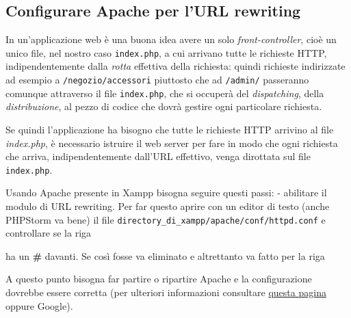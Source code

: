 \hypertarget{configurare-apache-per-lurl-rewriting}{%
\subsection{Configurare Apache per l'URL
rewriting}\label{configurare-apache-per-lurl-rewriting}}

In un'applicazione web è una buona idea avere un solo
\emph{front-controller}, cioè un unico file, nel nostro caso
\texttt{index.php}, a cui arrivano tutte le richieste HTTP,
indipendentemente dalla \emph{rotta} effettiva della richiesta: quindi
richieste indirizzate ad esempio a \texttt{/negozio/accessori} piuttosto
che ad \texttt{/admin/} passeranno comunque attraverso il file
\texttt{index.php}, che si occuperà del \emph{dispatching}, della
\emph{distribuzione}, al pezzo di codice che dovrà gestire ogni
particolare richiesta.

Se quindi l'applicazione ha bisogno che tutte le richieste HTTP arrivino
al file \emph{index.php}, è necessario istruire il web server per fare
in modo che ogni richiesta che arriva, indipendentemente dall'URL
effettivo, venga dirottata sul file \texttt{index.php}.

Usando Apache presente in Xampp bisogna seguire questi passi: -
abilitare il modulo di URL rewriting. Per far questo aprire con un
editor di testo (anche PHPStorm va bene) il file
\texttt{directory\_di\_xampp/apache/conf/httpd.conf} e controllare se la
riga

\begin{Shaded}
\begin{Highlighting}[]
\end{Highlighting}
\end{Shaded}

ha un \textbf{\#} davanti. Se così fosse va eliminato e altrettanto va
fatto per la riga

\begin{Shaded}
\begin{Highlighting}[]
\end{Highlighting}
\end{Shaded}

A questo punto bisogna far partire o ripartire Apache e la
configurazione dovrebbe essere corretta (per ulteriori informazioni
consultare
\href{https://www.slimframework.com/docs/v4/start/web-servers.html}{questa
pagina} oppure Google).


